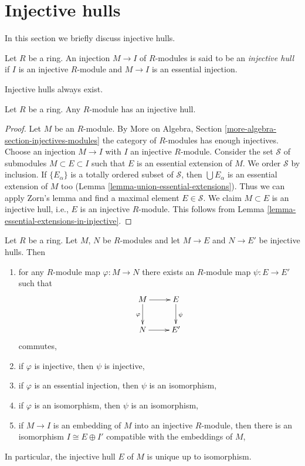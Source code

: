 \section{Injective hulls}
\label{section-injective-hull}

\noindent
In this section we briefly discuss injective hulls.

\begin{definition}
\label{definition-injective-hull}
Let $R$ be a ring. An injection $M \to I$ of $R$-modules is said
to be an {\it injective hull} if $I$ is an injective $R$-module and
$M \to I$ is an essential injection.
\end{definition}

\noindent
Injective hulls always exist.

\begin{lemma}
\label{lemma-injective-hull}
Let $R$ be a ring. Any $R$-module has an injective hull.
\end{lemma}

\begin{proof}
Let $M$ be an $R$-module. By
More on Algebra, Section \ref{more-algebra-section-injectives-modules}
the category of $R$-modules has enough injectives.
Choose an injection $M \to I$ with $I$ an injective $R$-module.
Consider the set $\mathcal{S}$ of submodules $M \subset E \subset I$
such that $E$ is an essential extension of $M$. We order $\mathcal{S}$
by inclusion. If $\{E_\alpha\}$ is a totally ordered subset
of $\mathcal{S}$, then $\bigcup E_\alpha$ is an essential extension of $M$
too (Lemma \ref{lemma-union-essential-extensions}).
Thus we can apply Zorn's lemma and find a maximal element
$E \in \mathcal{S}$. We claim $M \subset E$ is an injective hull, i.e.,
$E$ is an injective $R$-module. This follows from
Lemma \ref{lemma-essential-extensions-in-injective}.
\end{proof}

\begin{lemma}
\label{lemma-injective-hull-unique}
Let $R$ be a ring. Let $M$, $N$ be $R$-modules and let $M \to E$
and $N \to E'$ be injective hulls. Then
\begin{enumerate}
\item for any $R$-module map $\varphi : M \to N$ there exists an
$R$-module map $\psi : E \to E'$ such that
$$
\xymatrix{
M \ar[r] \ar[d]_\varphi & E \ar[d]^\psi \\
N \ar[r] & E'
}
$$
commutes,
\item if $\varphi$ is injective, then $\psi$ is injective,
\item if $\varphi$ is an essential injection, then $\psi$ is an isomorphism,
\item if $\varphi$ is an isomorphism, then $\psi$ is an isomorphism,
\item if $M \to I$ is an embedding of $M$ into an injective $R$-module,
then there is an isomorphism $I \cong E \oplus I'$ compatible with
the embeddings of $M$,
\end{enumerate}
In particular, the injective hull $E$ of $M$ is unique up to isomorphism.
\end{lemma}

